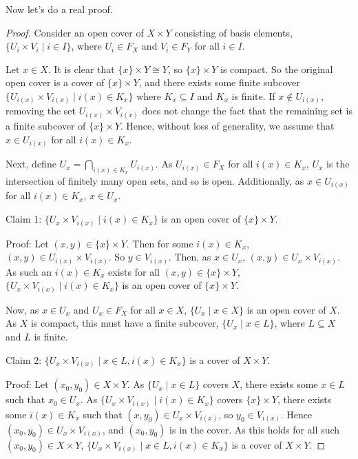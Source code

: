 Now let's do a real proof. 
\begin{proof}
	Consider an open cover of $X \times Y$ consisting of basis elements, $\{U_i \times V_i \mid i \in I\}$, where $U_i \in F_X$ and $V_i \in F_Y$ for all $i \in I$.
	
	Let $x \in X$. It is clear that $\{x\} \times Y \cong Y$, so $\{x\} \times Y$ is compact. So the original open cover is a cover of $\{x\} \times Y$, and there exists some finite subcover $\{U_{i(x)} \times V_{i(x)} \mid i(x) \in K_x\}$ where $K_x \subseteq I$ and $K_x$ is finite. If $x \notin U_{i(x)}$, removing the set $U_{i(x)} \times V_{i(x)}$ does not change the fact that the remaining set is a finite subcover of $\{x\} \times Y$. Hence, without loss of generality, we assume that $x \in U_{i(x)}$ for all $i(x) \in K_x$.
	
	Next, define $\displaystyle{U_x = \bigcap_{i(x) \in K_x} U_{i(x)}}$. As $U_{i(x)} \in F_X$ for all $i(x) \in K_x$, $U_x$ is the intersection of finitely many open sets, and so is open. Additionally, as $x \in U_{i(x)}$ for all $i(x) \in K_x$, $x \in U_x$.
	
	Claim 1: $\{U_x \times V_{i(x)} \mid i(x) \in K_x\}$ is an open cover of $\{x\} \times Y$.
	
	Proof: Let $(x,y) \in \{x\} \times Y$. Then for some $i(x) \in K_x$, $(x,y) \in U_{i(x)} \times V_{i(x)}$. So $y \in V_{i(x)}$. Then, as $x \in U_x$, $(x,y) \in U_x \times V_{i(x)}$. As such an $i(x) \in K_x$ exists for all $(x,y) \in \{x\} \times Y$, $\{U_x \times V_{i(x)} \mid i(x) \in K_x\}$ is an open cover of $\{x\} \times Y$.
	
	Now, as $x \in U_x$ and $U_x \in F_X$ for all $x \in X$, $\{U_x \mid x \in X\}$ is an open cover of $X$. As $X$ is compact, this must have a finite subcover, $\{U_x \mid x \in L\}$, where $L \subseteq X$ and $L$ is finite.
	
	Claim 2: $\{U_x \times V_{i(x)} \mid x \in L, i(x) \in K_x\}$ is a cover of $X \times Y$.
	
	Proof: Let $(x_0,y_0) \in X \times Y$. As $\{U_x \mid x \in L\}$ covers $X$, there exists some $x \in L$ such that $x_0 \in U_x$. As $\{U_x \times V_{i(x)} \mid i(x) \in K_x\}$ covers $\{x\} \times Y$, there exists some $i(x) \in K_x$ such that $(x,y_0) \in U_x \times V_{i(x)}$, so $y_0 \in V_{i(x)}$. Hence $(x_0, y_0) \in U_x \times V_{i(x)}$, and $(x_0,y_0)$ is in the cover. As this holds for all such $(x_0,y_0) \in X \times Y$, $\{U_x \times V_{i(x)} \mid x \in L, i(x) \in K_x\}$ is a cover of $X \times Y$.
	

\end{proof}
